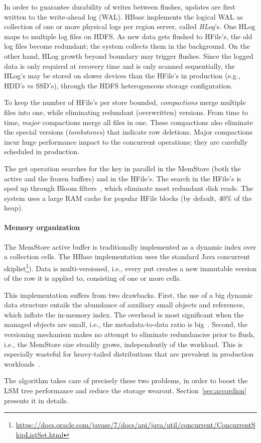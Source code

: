 In order to guarantee durability of writes between flushes, updates are first written to 
the write-ahead log (WAL). HBase implements the logical WAL as collection of one or more physical 
logs per region server, called \emph{HLog}'s. One HLog maps to multiple log files on HDFS. 
As new data gets flushed to HFile's, the old log files become redundant; the system collects 
them in the background. On the other hand, HLog growth beyond boundary may trigger flushes. 
Since the logged data is only required at recovery time and is only scanned sequentially, the HLog's 
may be stored on slower devices than the HFile's in production (e.g., HDD's vs SSD's),
through the HDFS heterogeneous storage configuration. 

To keep the number of HFile's per store bounded, \emph{compactions} merge multiple files 
into one, while eliminating redundant (overwritten) versions. From time to time, \emph{major} 
compactions merge all files in one. These compactions also eliminate the special versions 
({\em tombstones}) that indicate row deletions. Major compactions incur huge performance
impact to the concurrent operations; they are carefully scheduled in production. 

The get operation searches for the key in parallel in the MemStore (both the active and the 
frozen buffers) and in the HFile's. The search in the HFile's is sped up through Bloom 
filters~\cite{Chang2008}, which eliminate most redundant disk reads. The system 
uses a large RAM cache for popular HFile blocks (by default, $40\%$ of the heap).

\paragraph{Memory organization}
The MemStore active buffer is traditionally implemented as a dynamic index over a collection cells.  
The HBase implementation uses the standard Java concurrent skiplist\footnote{\small{\url{https://docs.oracle.com/javase/7/docs/api/java/util/concurrent/ConcurrentSkipListSet.html}}}).
Data is multi-versioned, i.e., every put creates a new immutable version of the row it is applied to, 
consisting of one or more cells. 

This implementation suffers from two drawbacks. First, the use of a big dynamic data structure entails 
the abundance of auxiliary small objects and references, which inflate the in-memory index. 
The overhead is most significant when the managed objects
are small, i.e., the metadata-to-data ratio is big~\cite{Wu2015}. Second, the versioning mechanism 
makes no attempt to eliminate redundancies prior to flush, i.e., the MemStore size  steadily grows, 
independently of the workload. This is especially wasteful for heavy-tailed distributions that are 
prevalent in production workloads~\cite{Devineni:2015}. 

The \sys\/ algorithm takes care of precisely these two problems, in order to boost the 
LSM tree performance and reduce the storage wearout. Section~\ref{sec:accordion} 
presents it in details. 







